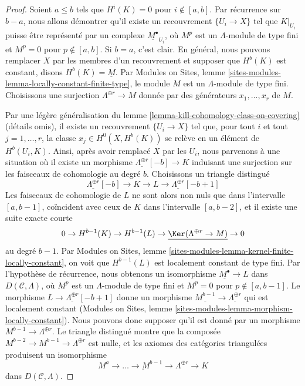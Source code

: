 \begin{proof}
Soient $a \leq b$ tels que $H^i(K) = 0$ pour $i \not \in [a, b]$. Par
récurrence sur $b - a$, nous allons démontrer qu'il existe un recouvrement
$\{U_i \to X\}$ tel que $K|_{U_i}$ puisse être représenté par un complexe
$\underline{M^\bullet}_{U_i}$, où $M^p$ est un $\Lambda$-module de type fini
et $M^p = 0$ pour $p \not \in [a, b]$. Si $b = a$, c'est clair. En général,
nous pouvons remplacer $X$ par les membres d'un recouvrement et supposer que
$H^b(K)$ est constant, disons $H^b(K) = \underline{M}$. Par Modules on Sites,
lemme \ref{sites-modules-lemma-locally-constant-finite-type}, le module $M$
est un $\Lambda$-module de type fini. Choisissons une surjection
$\Lambda^{\oplus r} \to M$ donnée par des générateurs $x_1, \ldots, x_r$ de
$M$.

\medskip\noindent
Par une légère généralisation du lemme
\ref{lemma-kill-cohomology-class-on-covering} (détails omis), il existe un
recouvrement $\{U_i \to X\}$ tel que, pour tout $i$ et tout $j = 1, \ldots, r$,
la classe $x_j \in H^0(X, H^b(K))$ se relève en un élément de $H^b(U_i, K)$.
Ainsi, après avoir remplacé $X$ par les $U_i$, nous
parvenons à une situation où il existe un morphisme
$\underline{\Lambda^{\oplus r}}[-b] \to K$ induisant une surjection sur les
faisceaux de cohomologie au degré $b$. Choisissons un triangle distingué
$$
\underline{\Lambda^{\oplus r}}[-b] \to K \to L \to
\underline{\Lambda^{\oplus r}}[-b + 1]
$$
Les faisceaux de cohomologie de $L$ ne sont alors non nuls que dans
l'intervalle $[a, b - 1]$, coïncident avec ceux de $K$ dans l'intervalle
$[a, b - 2]$, et il existe une suite exacte courte
$$
0 \to H^{b - 1}(K) \to H^{b - 1}(L) \to
\underline{\Ker(\Lambda^{\oplus r} \to M)} \to 0
$$
au degré $b - 1$. Par Modules on Sites, lemme
\ref{sites-modules-lemma-kernel-finite-locally-constant}, on voit que
$H^{b - 1}(L)$ est localement constant de type fini. Par l'hypothèse de
récurrence, nous obtenons un isomorphisme
$\underline{M^\bullet} \to L$ dans $D(\mathcal{C}, \Lambda)$,
où $M^p$ est un $\Lambda$-module de type fini et $M^p = 0$ pour
$p \not \in [a, b - 1]$. Le morphisme
$L \to \underline{\Lambda^{\oplus r}}[-b + 1]$ donne un morphisme
$\underline{M^{b - 1}} \to \underline{\Lambda^{\oplus r}}$ qui est
localement constant (Modules on Sites, lemme
\ref{sites-modules-lemma-morphism-locally-constant}). Nous pouvons donc
supposer qu'il est donné par un morphisme
$M^{b - 1} \to \Lambda^{\oplus r}$. Le triangle distingué montre que la
composée $M^{b - 2} \to M^{b - 1} \to \Lambda^{\oplus r}$ est nulle, et les
axiomes des catégories triangulées produisent un isomorphisme
$$
\underline{M^a \to \ldots \to M^{b - 1} \to \Lambda^{\oplus r}}
\longrightarrow K
$$
dans $D(\mathcal{C}, \Lambda)$.
\end{proof}

